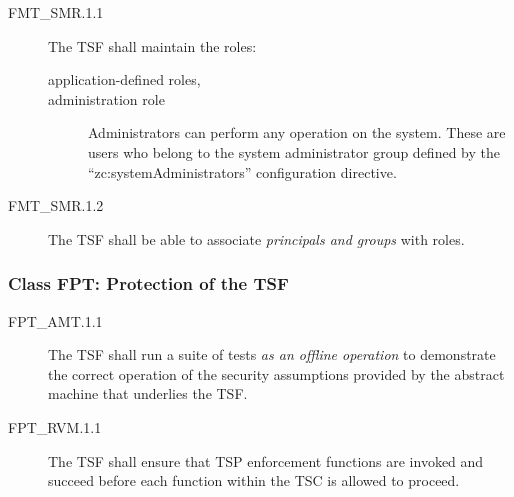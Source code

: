\documentclass[12pt,english]{scrbook}
\begin{document}




\begin{description}
    \item[FMT{\_}SMR.1.1]

    The TSF shall maintain the roles:
\begin{description}
\item[application-defined roles,]

\item[administration role]

Administrators can perform any operation on the system. These are users who
belong to the system administrator group defined by the
``zc:systemAdministrators'' configuration directive.

\end{description}

\item[FMT{\_}SMR.1.2]

The TSF shall be able to associate \emph{principals and groups} with roles.

\end{description}





\subsubsection{Class FPT: Protection of the TSF}





\begin{description}

\item[FPT{\_}AMT.1.1 ]


The TSF shall run a suite of tests \emph{as an offline
operation} to demonstrate the correct operation of the security
assumptions provided by the abstract machine that underlies the
TSF.



\end{description}


\begin{description}

\item[FPT{\_}RVM.1.1 ]


The TSF shall ensure that TSP enforcement functions are invoked
and succeed before each function within the TSC is allowed to
proceed.



\end{description}
\end{document}
